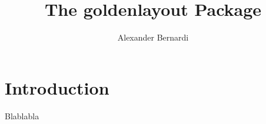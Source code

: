 \documentclass[a4paper,10pt]{scrarticle}
\title{\textnormal{The \textbf{goldenlayout} Package}}
\author{Alexander Bernardi}
\begin{document}
\maketitle

\section{Introduction}

Blablabla
\end{document}

